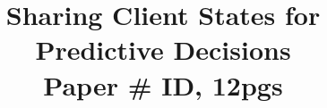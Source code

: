 \documentclass{sig-alternate-10pt}
\begin{document}
\title{Sharing Client States for Predictive Decisions\\
  \normalsize{Paper \# ID, 12pgs}\vspace{-0.5cm}}


\maketitle 



















{\scriptsize


}

%
\end{document}
